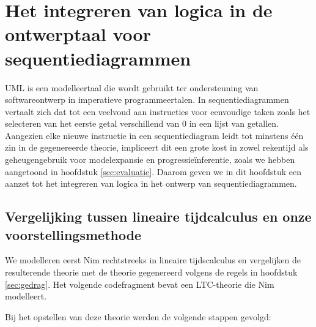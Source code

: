 \chapter{Het integreren van logica in de ontwerptaal voor sequentiediagrammen}\label{sec:decl-seq}
UML is een modelleertaal die wordt gebruikt ter ondersteuning van softwareontwerp in imperatieve programmeertalen. In sequentiediagrammen vertaalt zich dat tot een veelvoud aan instructies voor eenvoudige taken zoals het selecteren van het eerste getal verschillend van 0 in een lijst van getallen. Aangezien elke nieuwe instructie in een sequentiediagram leidt tot minstens \'e\'en zin in de gegenereerde theorie, impliceert dit een grote kost in zowel rekentijd als geheugengebruik voor modelexpansie en progressie\"inferentie, zoals we hebben aangetoond in hoofdstuk \ref{sec:evaluatie}. Daarom geven we in dit hoofdstuk een aanzet tot het integreren van logica in het ontwerp van sequentiediagrammen.

\section{Vergelijking tussen lineaire tijdcalculus en onze voorstellingsmethode}

We modelleren eerst Nim rechtstreeks in lineaire tijdscalculus en vergelijken de resulterende theorie met de theorie gegenereerd volgens de regels in hoofdstuk \ref{sec:gedrag}. Het volgende codefragment bevat een LTC-theorie die Nim modelleert. 

\label{code:ltc-nim}

Bij het opstellen van deze theorie werden de volgende stappen gevolgd:

